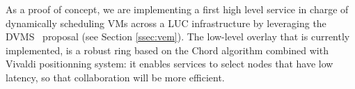 As a proof of concept, we are implementing a first high level service in charge
of dynamically scheduling VMs across a LUC infrastructure by leveraging the
DVMS~\cite{quesnel:2012} proposal (see Section \ref{ssec:vem}). The low-level
overlay that is currently implemented, is a robust ring based on the  Chord  algorithm
combined with Vivaldi positionning system: it enables services to select nodes that have
low latency, so that collaboration will be more efficient. 

%

